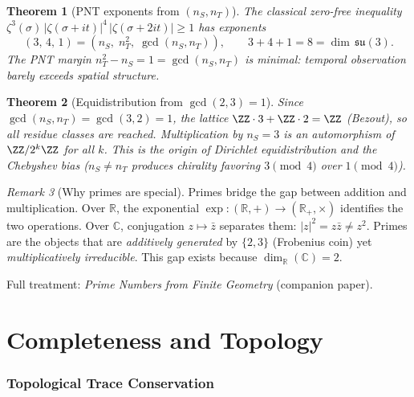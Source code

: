 \documentclass[12pt]{article}
\newtheorem{theorem}{Theorem}[section]
\theoremstyle{remark}
\newtheorem{remark}[theorem]{Remark}
\theoremstyle{definition}
\newcommand{\CC}{\mathbb{C}}
\newcommand{\RR}{\mathbb{R}}
\begin{document}
\begin{theorem}[PNT exponents from $(n_S, n_T)$]
\label{thm:pnt_exponents}
The classical zero-free inequality $\zeta^3(\sigma)\,|\zeta(\sigma+it)|^4\,|\zeta(\sigma+2it)|\ge 1$ has exponents
\begin{equation}
\boxed{(3,\,4,\,1) = (n_S,\; n_T^2,\; \gcd(n_S,n_T)), \qquad 3+4+1 = 8 = \dim\,\mathfrak{su}(3).}
\end{equation}
The PNT margin $n_T^2 - n_S = 1 = \gcd(n_S,n_T)$ is minimal: temporal observation barely exceeds spatial structure.
\end{theorem}

\begin{theorem}[Equidistribution from $\gcd(2,3)=1$]
\label{thm:equidistrib}
Since $\gcd(n_S, n_T) = \gcd(3,2) = 1$, the lattice $\ZZ\cdot 3 + \ZZ\cdot 2 = \ZZ$ (Bezout), so all residue classes are reached.  Multiplication by $n_S=3$ is an automorphism of $\ZZ/2^k\ZZ$ for all $k$.  This is the origin of Dirichlet equidistribution and the Chebyshev bias ($n_S \neq n_T$ produces chirality favoring $3\!\pmod{4}$ over $1\!\pmod{4}$).
\end{theorem}

\begin{remark}[Why primes are special]
Primes bridge the gap between addition and multiplication.  Over $\RR$, the exponential $\exp\!: (\RR,+)\to(\RR_+,\times)$ identifies the two operations.  Over $\CC$, conjugation $z\mapsto\bar z$ separates them: $|z|^2 = z\bar z \neq z^2$.  Primes are the objects that are \emph{additively generated} by $\{2,3\}$ (Frobenius coin) yet \emph{multiplicatively irreducible}.  This gap exists because $\dim_\RR(\CC) = 2$.
\end{remark}

\noindent Full treatment: \textit{Prime Numbers from Finite Geometry} (companion paper).

\part{Completeness and Topology}

\section{Topological Trace Conservation}
\label{ch:ghosts}
\end{document}
